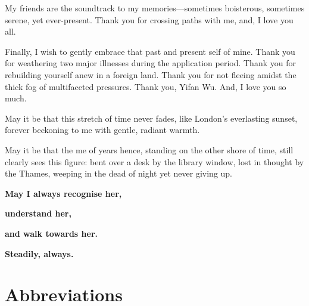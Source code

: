 \documentclass[
  12pt,
  oneside]{book}
\begin{document}
My friends are the soundtrack to my memories---sometimes boisterous, sometimes serene, yet ever-present. Thank you for crossing paths with me, and, I love you all.

Finally, I wish to gently embrace that past and present self of mine. Thank you for weathering two major illnesses during the application period. Thank you for rebuilding yourself anew in a foreign land. Thank you for not fleeing amidst the thick fog of multifaceted pressures. Thank you, Yifan Wu. And, I love you so much.

May it be that this stretch of time never fades, like London's everlasting sunset, forever beckoning to me with gentle, radiant warmth.

May it be that the me of years hence, standing on the other shore of time, still clearly sees this figure: bent over a desk by the library window, lost in thought by the Thames, weeping in the dead of night yet never giving up.

\textbf{May I always recognise her,}

\textbf{understand her,}

\textbf{and walk towards her.}

\textbf{Steadily, always.}

\setcounter{tocdepth}{3}
\tableofcontents
\listoffigures
\listoftables

\chapter*{Abbreviations}\label{abbreviations}
\end{document}
